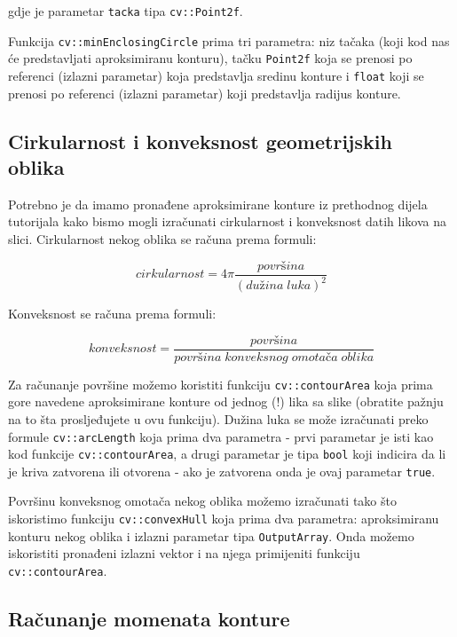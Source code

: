 \documentclass[a4paper, 12pt]{article}
\begin{document}
gdje je parametar \lstinline{tacka} tipa \lstinline{cv::Point2f}.

Funkcija \lstinline{cv::minEnclosingCircle} prima tri parametra: niz tačaka (koji kod nas će predstavljati aproksimiranu konturu), tačku \lstinline{Point2f} koja se prenosi po referenci (izlazni parametar) koja predstavlja sredinu konture i \lstinline{float} koji se prenosi po referenci (izlazni parametar) koji predstavlja radijus konture.

\subsection*{Cirkularnost i konveksnost geometrijskih oblika}

Potrebno je da imamo pronađene aproksimirane konture iz prethodnog dijela tutorijala kako bismo mogli izračunati cirkularnost i konveksnost datih likova na slici. Cirkularnost nekog oblika se računa prema formuli:

\begin{equation*}
    cirkularnost = 4 \pi \frac{površina}{(dužina \; luka)^2}
\end{equation*}

Konveksnost se računa prema formuli:

\begin{equation*}
    konveksnost = \frac{površina}{površina \;  konveksnog \; omotača \; oblika}
\end{equation*}

Za računanje površine možemo koristiti funkciju \lstinline{cv::contourArea} koja prima gore navedene aproksimirane konture od jednog (!) lika sa slike (obratite pažnju na to šta prosljeđujete u ovu funkciju). Dužina luka se može izračunati preko formule \lstinline{cv::arcLength} koja prima dva parametra - prvi parametar je isti kao kod funkcije \lstinline{cv::contourArea}, a drugi parametar je tipa \lstinline{bool} koji indicira da li je kriva zatvorena ili otvorena - ako je zatvorena onda je ovaj parametar \lstinline{true}.

Površinu konveksnog omotača nekog oblika možemo izračunati tako što iskoristimo funkciju \lstinline{cv::convexHull} koja prima dva parametra: aproksimiranu konturu nekog oblika i izlazni parametar tipa \lstinline{OutputArray}. Onda možemo iskoristiti pronađeni izlazni vektor i na njega primijeniti funkciju \lstinline{cv::contourArea}.

\subsection*{Računanje momenata konture}
\end{document}
